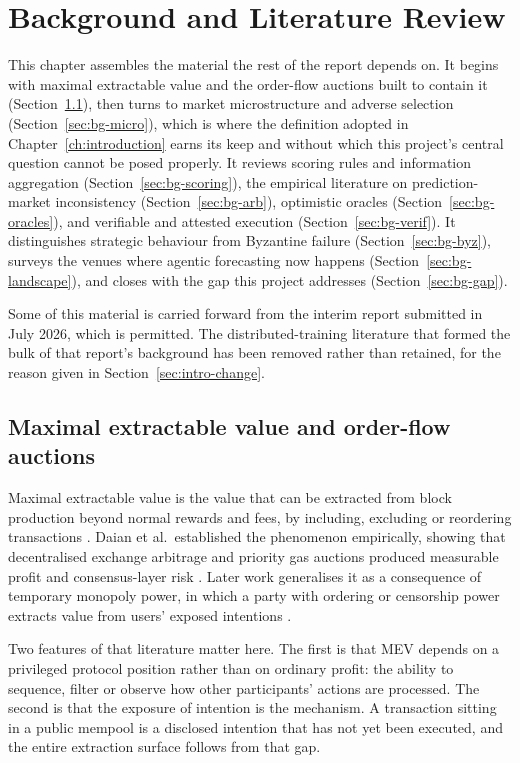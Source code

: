 \chapter{Background and Literature Review}
\label{ch:background}

This chapter assembles the material the rest of the report depends on. It begins with
maximal extractable value and the order-flow auctions built to contain it
(Section~\ref{sec:bg-mev}), then turns to market microstructure and adverse selection
(Section~\ref{sec:bg-micro}), which is where the definition adopted in
Chapter~\ref{ch:introduction} earns its keep and without which this project's central
question cannot be posed properly. It reviews scoring rules and information aggregation
(Section~\ref{sec:bg-scoring}), the empirical literature on prediction-market inconsistency
(Section~\ref{sec:bg-arb}), optimistic oracles (Section~\ref{sec:bg-oracles}), and
verifiable and attested execution (Section~\ref{sec:bg-verif}). It distinguishes strategic
behaviour from Byzantine failure (Section~\ref{sec:bg-byz}), surveys the venues where
agentic forecasting now happens (Section~\ref{sec:bg-landscape}), and closes with the gap
this project addresses (Section~\ref{sec:bg-gap}).

Some of this material is carried forward from the interim report submitted in July 2026,
which is permitted. The distributed-training literature that formed the bulk of that
report's background has been removed rather than retained, for the reason given in
Section~\ref{sec:intro-change}.

\section{Maximal extractable value and order-flow auctions}
\label{sec:bg-mev}

Maximal extractable value is the value that can be extracted from block production beyond
normal rewards and fees, by including, excluding or reordering transactions
\cite{ethereummev}. Daian et al.\ established the phenomenon empirically, showing that
decentralised exchange arbitrage and priority gas auctions produced measurable profit and
consensus-layer risk \cite{daian2019flashboys}. Later work generalises it as a consequence
of temporary monopoly power, in which a party with ordering or censorship power extracts
value from users' exposed intentions \cite{chitra2023uncertainty}.

Two features of that literature matter here. The first is that MEV depends on a privileged
protocol position rather than on ordinary profit: the ability to sequence, filter or observe
how other participants' actions are processed. The second is that the exposure of intention
is the mechanism. A transaction sitting in a public mempool is a disclosed intention that
has not yet been executed, and the entire extraction surface follows from that gap.

